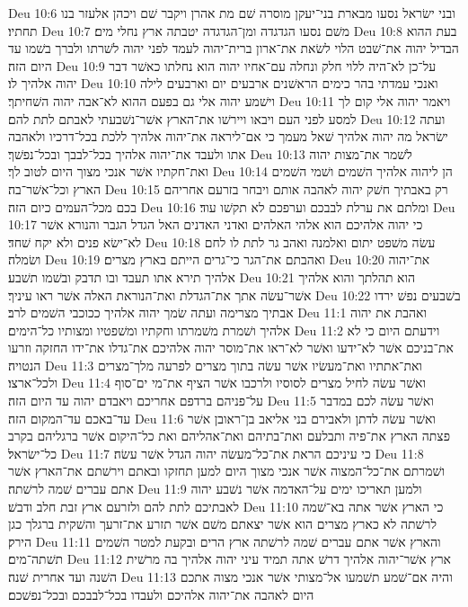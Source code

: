 Deu 10:6  ובני ישׂראל נסעו מבארת בני־יעקן מוסרה שׁם מת אהרן ויקבר שׁם ויכהן אלעזר בנו תחתיו׃
Deu 10:7  משׁם נסעו הגדגדה ומן־הגדגדה יטבתה ארץ נחלי מים׃
Deu 10:8  בעת ההוא הבדיל יהוה את־שׁבט הלוי לשׂאת את־ארון ברית־יהוה לעמד לפני יהוה לשׁרתו ולברך בשׁמו עד היום הזה׃
Deu 10:9  על־כן לא־היה ללוי חלק ונחלה עם־אחיו יהוה הוא נחלתו כאשׁר דבר יהוה אלהיך לו׃
Deu 10:10  ואנכי עמדתי בהר כימים הראשׁנים ארבעים יום וארבעים לילה וישׁמע יהוה אלי גם בפעם ההוא לא־אבה יהוה השׁחיתך׃
Deu 10:11  ויאמר יהוה אלי קום לך למסע לפני העם ויבאו ויירשׁו את־הארץ אשׁר־נשׁבעתי לאבתם לתת להם׃
Deu 10:12  ועתה ישׂראל מה יהוה אלהיך שׁאל מעמך כי אם־ליראה את־יהוה אלהיך ללכת בכל־דרכיו ולאהבה אתו ולעבד את־יהוה אלהיך בכל־לבבך ובכל־נפשׁך׃
Deu 10:13  לשׁמר את־מצות יהוה ואת־חקתיו אשׁר אנכי מצוך היום לטוב לך׃
Deu 10:14  הן ליהוה אלהיך השׁמים ושׁמי השׁמים הארץ וכל־אשׁר־בה׃
Deu 10:15  רק באבתיך חשׁק יהוה לאהבה אותם ויבחר בזרעם אחריהם בכם מכל־העמים כיום הזה׃
Deu 10:16  ומלתם את ערלת לבבכם וערפכם לא תקשׁו עוד׃
Deu 10:17  כי יהוה אלהיכם הוא אלהי האלהים ואדני האדנים האל הגדל הגבר והנורא אשׁר לא־ישׂא פנים ולא יקח שׁחד׃
Deu 10:18  עשׂה משׁפט יתום ואלמנה ואהב גר לתת לו לחם ושׂמלה׃
Deu 10:19  ואהבתם את־הגר כי־גרים הייתם בארץ מצרים׃
Deu 10:20  את־יהוה אלהיך תירא אתו תעבד ובו תדבק ובשׁמו תשׁבע׃
Deu 10:21  הוא תהלתך והוא אלהיך אשׁר־עשׂה אתך את־הגדלת ואת־הנוראת האלה אשׁר ראו עיניך׃
Deu 10:22  בשׁבעים נפשׁ ירדו אבתיך מצרימה ועתה שׂמך יהוה אלהיך ככוכבי השׁמים לרב׃
Deu 11:1  ואהבת את יהוה אלהיך ושׁמרת משׁמרתו וחקתיו ומשׁפטיו ומצותיו כל־הימים׃
Deu 11:2  וידעתם היום כי לא את־בניכם אשׁר לא־ידעו ואשׁר לא־ראו את־מוסר יהוה אלהיכם את־גדלו את־ידו החזקה וזרעו הנטויה׃
Deu 11:3  ואת־אתתיו ואת־מעשׂיו אשׁר עשׂה בתוך מצרים לפרעה מלך־מצרים ולכל־ארצו׃
Deu 11:4  ואשׁר עשׂה לחיל מצרים לסוסיו ולרכבו אשׁר הציף את־מי ים־סוף על־פניהם ברדפם אחריכם ויאבדם יהוה עד היום הזה׃
Deu 11:5  ואשׁר עשׂה לכם במדבר עד־באכם עד־המקום הזה׃
Deu 11:6  ואשׁר עשׂה לדתן ולאבירם בני אליאב בן־ראובן אשׁר פצתה הארץ את־פיה ותבלעם ואת־בתיהם ואת־אהליהם ואת כל־היקום אשׁר ברגליהם בקרב כל־ישׂראל׃
Deu 11:7  כי עיניכם הראת את־כל־מעשׂה יהוה הגדל אשׁר עשׂה׃
Deu 11:8  ושׁמרתם את־כל־המצוה אשׁר אנכי מצוך היום למען תחזקו ובאתם וירשׁתם את־הארץ אשׁר אתם עברים שׁמה לרשׁתה׃
Deu 11:9  ולמען תאריכו ימים על־האדמה אשׁר נשׁבע יהוה לאבתיכם לתת להם ולזרעם ארץ זבת חלב ודבשׁ׃
Deu 11:10  כי הארץ אשׁר אתה בא־שׁמה לרשׁתה לא כארץ מצרים הוא אשׁר יצאתם משׁם אשׁר תזרע את־זרעך והשׁקית ברגלך כגן הירק׃
Deu 11:11  והארץ אשׁר אתם עברים שׁמה לרשׁתה ארץ הרים ובקעת למטר השׁמים תשׁתה־מים׃
Deu 11:12  ארץ אשׁר־יהוה אלהיך דרשׁ אתה תמיד עיני יהוה אלהיך בה מרשׁית השׁנה ועד אחרית שׁנה׃
Deu 11:13  והיה אם־שׁמע תשׁמעו אל־מצותי אשׁר אנכי מצוה אתכם היום לאהבה את־יהוה אלהיכם ולעבדו בכל־לבבכם ובכל־נפשׁכם׃
